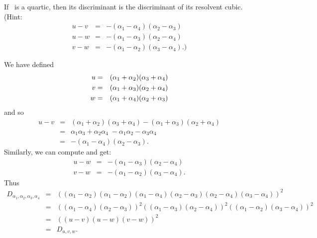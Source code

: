 \begin{myenumerate}

\item
\begin{excopy}
If
\label{ex:disc:uvw}
\fx\ is a quartic, then its discriminant is the discriminant of its
resolvent cubic. (Hint:
 \begin{eqnarray*}
  u - v & = & -(\alpha_1 - \alpha_4)(\alpha_2 - \alpha_3) \\
  u - w & = & -(\alpha_1 - \alpha_3)(\alpha_2 - \alpha_4) \\
  v - w & = & -(\alpha_1 - \alpha_2)(\alpha_3 - \alpha_4).\textrm{)}
 \end{eqnarray*}
\end{excopy}

We have defined
\begin{eqnarray}
 u & = & (\alpha_1 + \alpha_2)(\alpha_3 + \alpha_4) \notag \\
 v & = & (\alpha_1 + \alpha_3)(\alpha_2 + \alpha_4) \\
                                                    \label{eq:resolv:uvw}
 w & = & (\alpha_1 + \alpha_4)(\alpha_2 + \alpha_3) \notag
\end{eqnarray}
and so
\begin{eqnarray*}
u - v
 & = & (\alpha_1 + \alpha_2)(\alpha_3 + \alpha_4) -
       (\alpha_1 + \alpha_3)(\alpha_2 + \alpha_4) \\
 & = &   \alpha_1\alpha_3 + \alpha_2\alpha_4 \;
       - \alpha_1\alpha_2 - \alpha_3\alpha_4 \\
 & = & -(\alpha_1 - \alpha_4)(\alpha_2 - \alpha_3).
\end{eqnarray*}
Similarly, we can compute and get:
\begin{eqnarray*}
  u - w & = & -(\alpha_1 - \alpha_3)(\alpha_2 - \alpha_4) \\
  v - w & = & -(\alpha_1 - \alpha_2)(\alpha_3 - \alpha_4).
\end{eqnarray*}
Thus
\begin{eqnarray*}
D_{\alpha_1,\alpha_2,\alpha_3,\alpha_4}
 & = &
 \left((\alpha_1 - \alpha_2)(\alpha_1 - \alpha_2)
       (\alpha_1 - \alpha_4)(\alpha_2 - \alpha_3)
       (\alpha_2 - \alpha_4)(\alpha_3 - \alpha_4)\right)^2 \\
 & = &
 \left((\alpha_1 - \alpha_4)(\alpha_2 - \alpha_3)\right)^2
 \left((\alpha_1 - \alpha_3)(\alpha_2 - \alpha_4)\right)^2
 \left((\alpha_1 - \alpha_2)(\alpha_3 - \alpha_4)\right)^2 \\
 & = & \left((u-v)(u-w)(v-w)\right)^2 \\
 & = & D_{u,v,w}.
\end{eqnarray*}



\end{myenumerate}
